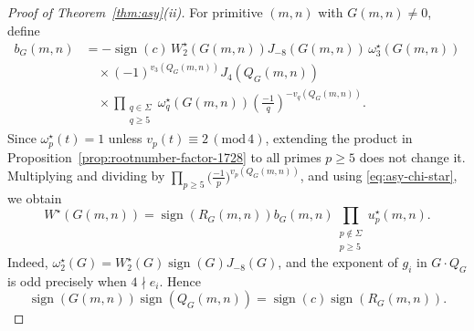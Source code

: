 \documentclass[12pt,reqno]{amsart}
\numberwithin{equation}{section}
\theoremstyle{definition}
\renewcommand{\ge}{\geqslant}
\DeclareMathOperator{\sign}{sign}
\newcommand{\rw}{W}
\renewcommand{\pmod}[1]{\,(\mathrm{mod}\,#1)}
\begin{document}
\begin{proof}[Proof of Theorem~\ref{thm:asy}(ii)]
For primitive $(m,n)$ with $G(m,n)\neq 0$, define
\begin{align*}
b_G(m,n)
&=-\sign(c)\,\rw_2^\star(G(m,n))J_{-8}(G(m,n))\,\omega_3^\star(G(m,n)) \\
&\quad \times (-1)^{v_3(Q_G(m,n))}J_4(Q_G(m,n)) \\
&\quad \times \prod_{\substack{q\in \Sigma\\ q\ge 5}}
\omega_q^\star(G(m,n))
\left(\frac{-1}{q}\right)^{-v_q(Q_G(m,n))}.
\end{align*}
Since $\omega_p^\star(t)=1$ unless $v_p(t)\equiv2\pmod4$, extending the product in Proposition~\ref{prop:rootnumber-factor-1728} to all primes $p\ge 5$ does not change it.
Multiplying and dividing by $\prod_{p\ge 5}\bigl(\frac{-1}{p}\bigr)^{v_p(Q_G(m,n))}$, and using \eqref{eq:asy-chi-star}, we obtain
\begin{equation}\label{eq:asy-factor-main-star}
\rw^\star(G(m,n))
=\sign(R_G(m,n))b_G(m,n)
\prod_{\substack{p\notin \Sigma\\ p\ge 5}}u_p^\star(m,n).
\end{equation}
Indeed, $\omega_2^\star(G)=\rw_2^\star(G)\sign(G)J_{-8}(G)$, and the exponent of $g_i$ in $G\cdot Q_G$ is odd precisely when $4\nmid e_i$.
Hence
\[
\sign(G(m,n))\sign(Q_G(m,n))=\sign(c)\sign(R_G(m,n)).
\]


\end{proof}
\end{document}
